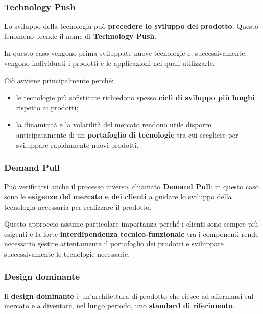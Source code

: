 \subsubsection*{Technology Push}

\noindent Lo sviluppo della tecnologia può \textbf{precedere lo sviluppo del prodotto}. Questo fenomeno prende il nome di \textbf{Technology Push}.

\medskip

\noindent In questo caso vengono prima sviluppate nuove tecnologie e, successivamente, vengono individuati i prodotti e le applicazioni nei quali utilizzarle.

\medskip

\noindent Ciò avviene principalmente perché:

\begin{itemize}
    \item le tecnologie più sofisticate richiedono spesso \textbf{cicli di sviluppo più lunghi} rispetto ai prodotti;
    \item la dinamicità e la volatilità del mercato rendono utile disporre anticipatamente di un \textbf{portafoglio di tecnologie} tra cui scegliere per sviluppare 
    rapidamente nuovi prodotti.
\end{itemize}

\subsubsection*{Demand Pull}

\noindent Può verificarsi anche il processo inverso, chiamato \textbf{Demand Pull}: in questo caso sono le \textbf{esigenze del mercato e dei clienti} a guidare lo 
sviluppo della tecnologia necessaria per realizzare il prodotto.

\medskip

\noindent Questo approccio assume particolare importanza perché i clienti sono sempre più esigenti e la forte \textbf{interdipendenza tecnico-funzionale} tra i componenti rende 
necessario gestire attentamente il portafoglio dei prodotti e sviluppare successivamente le tecnologie necessarie.

\subsubsection*{Design dominante}

\noindent Il \textbf{design dominante} è un'architettura di prodotto che riesce ad affermarsi sul mercato e a diventare, nel lungo periodo, uno \textbf{standard di riferimento}.

